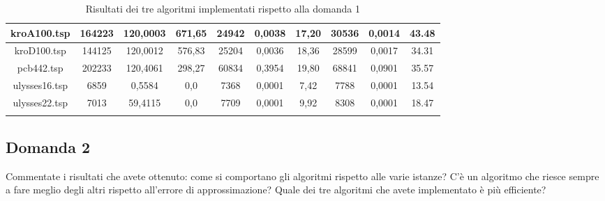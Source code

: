 \begin{center}
\begin{longtable}{|c|c|c|c|c|c|c|c|c|c|}
		kroA100.tsp& 164223 & 120,0003 & 671,65 & 24942 & 0,0038 & 17,20&30536 &0,0014 &43.48 \\ \hline
		kroD100.tsp& 144125 &120,0012 &576,83 &25204 & 0,0036 & 18,36 &28599 &0,0017 &34.31 \\ \hline
		pcb442.tsp& 202233&120,4061 &298,27 & 60834 & 0,3954 & 19,80 &68841 &0,0901 & 35.57\\ \hline
		ulysses16.tsp&6859 &0,5584 & 0,0 & 7368 & 0,0001 & 7,42&7788 & 0,0001 & 13.54\\ \hline
		ulysses22.tsp&7013 &59,4115 &0,0 &  7709 & 0,0001 & 9,92 &8308 &0,0001 &18.47 \\ \hline		 
     \caption{Risultati dei tre algoritmi implementati rispetto alla domanda 1}
     \label{results}
	\end{longtable}
\end{center}\vspace{-40pt}

\subsection{Domanda 2}
Commentate i risultati che avete ottenuto: come si comportano gli algoritmi rispetto alle varie istanze? C'è un algoritmo che riesce sempre a fare meglio degli altri rispetto all'errore di approssimazione? Quale dei tre algoritmi che avete implementato è più efficiente? 

